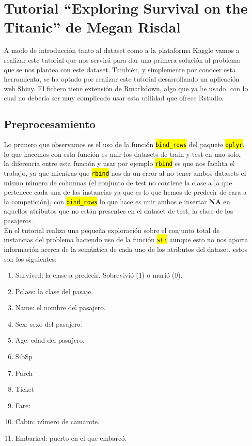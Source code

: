 \documentclass[10pt,a4paper]{article}
\newcommand{\code}[1]{\sethlcolor{rblue}\hl{\texttt{#1}}} %
\begin{document}
\appendix

\section{Tutorial ``Exploring Survival on the Titanic'' de Megan Risdal}

%

A modo de introducción tanto al dataset como a la plataforma Kaggle vamos a realizar este tutorial que nos servirá para dar una primera solución al problema que se nos plantea con este dataset. También, y simplemente por conocer esta herramienta, se ha optado por realizar este tutorial desarrollando un aplicación web Shiny. El fichero tiene extensión de Rmarkdown, algo que ya he usado, con lo cual no debería ser muy complicado usar esta utilidad que ofrece Rstudio.

\subsection{Preprocesamiento}

Lo primero que observamos es el uso de la función \code{bind\_rows} del paquete \code{dplyr}, lo que hacemos con esta función es unir los datasets de train y test en uno solo, la diferencia entre esta función y usar por ejemplo \code{rbind} es que nos facilita el trabajo, ya que mientras que \code{rbind} nos da un error al no tener ambos datasets el mismo número de columnas (el conjunto de test no contiene la clase a la que pertenece cada una de las instancias ya que es lo que hemos de predecir de cara a la competición), con \code{bind\_rows} lo que hace es unir ambos e insertar \textbf{NA} en aquellos atributos que no están presentes en el dataset de test, la clase de los pasajeros.\\

En el tutorial realiza una pequeña exploración sobre el conjunto total de instancias del problema haciendo uso de la función \code{str} aunque esto no nos aporta información acerca de la semántica de cada uno de los atributos del dataset, estos son los siguientes:

\begin{enumerate}
\item Survived: la clase a predecir. Sobrevivió (1) o murió (0).
\item Pclass: la clase del pasaje.
\item Name: el nombre del pasajero.
\item Sex: sexo del pasajero.
\item Age: edad del pasajero.
\item SibSp
\item Parch
\item Ticket
\item Fare: 
\item Cabin: número de camarote.
\item Embarked: puerto en el que embarcó.
\end{enumerate}
\end{document}
